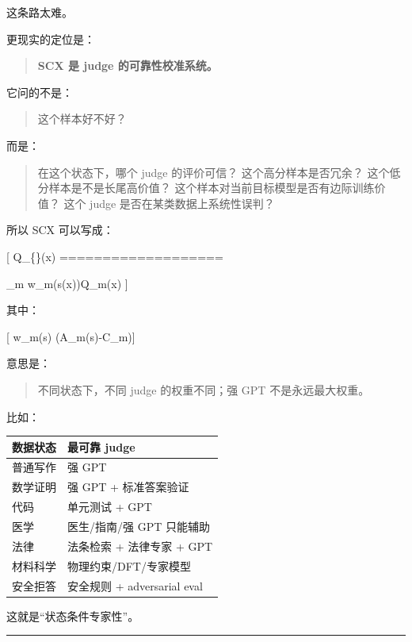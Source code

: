 \documentclass[
  12pt,
]{ctexart}
\begin{document}
这条路太难。

更现实的定位是：

\begin{quote}
\textbf{SCX 是 judge 的可靠性校准系统。}
\end{quote}

它问的不是：

\begin{quote}
这个样本好不好？
\end{quote}

而是：

\begin{quote}
在这个状态下，哪个 judge 的评价可信？ 这个高分样本是否冗余？
这个低分样本是不是长尾高价值？
这个样本对当前目标模型是否有边际训练价值？ 这个 judge
是否在某类数据上系统性误判？
\end{quote}

所以 SCX 可以写成：

{[} Q\_\{\}(x) ===================

\sum\_m w\_m(s(x))Q\_m(x) {]}

其中：

{[} w\_m(s) \propto \exp(\alpha A\_m(s)-\lambda C\_m){]}

意思是：

\begin{quote}
不同状态下，不同 judge 的权重不同；强 GPT 不是永远最大权重。
\end{quote}

比如：

\begin{longtable}[]{@{}ll@{}}
\toprule\noalign{}
数据状态 & 最可靠 judge \\
\midrule\noalign{}
\endhead
\bottomrule\noalign{}
\endlastfoot
普通写作 & 强 GPT \\
数学证明 & 强 GPT + 标准答案验证 \\
代码 & 单元测试 + GPT \\
医学 & 医生/指南/强 GPT 只能辅助 \\
法律 & 法条检索 + 法律专家 + GPT \\
材料科学 & 物理约束/DFT/专家模型 \\
安全拒答 & 安全规则 + adversarial eval \\
\end{longtable}

这就是``状态条件专家性''。

\begin{center}\rule{0.5\linewidth}{0.5pt}\end{center}
\end{document}
